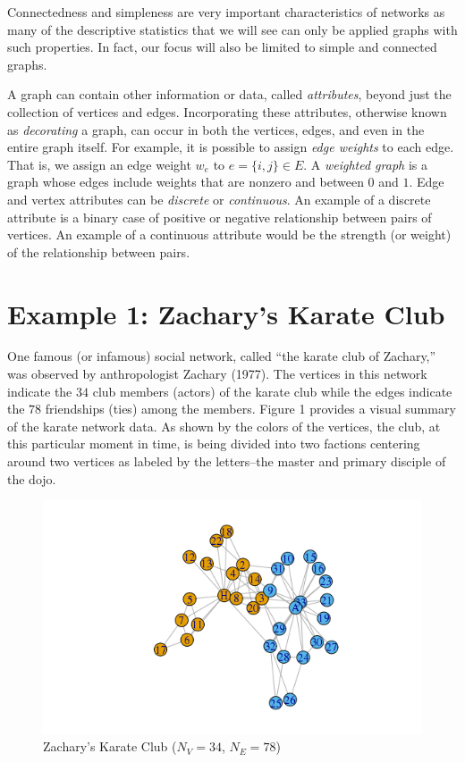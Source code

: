 \documentclass[12pt,twoside]{amherstthesis}
\begin{document}
  Connectedness and simpleness are very important characteristics of
  networks as many of the descriptive statistics that we will see can only
  be applied graphs with such properties. In fact, our focus will also be
  limited to simple and connected graphs.
  
  A graph can contain other information or data, called \emph{attributes},
  beyond just the collection of vertices and edges. Incorporating these
  attributes, otherwise known as \emph{decorating} a graph, can occur in
  both the vertices, edges, and even in the entire graph itself. For
  example, it is possible to assign \emph{edge weights} to each edge. That
  is, we assign an edge weight \(w_e\) to \(e = \{i, j\} \in E\). A
  \emph{weighted graph} is a graph whose edges include weights that are
  nonzero and between \(0\) and \(1\). Edge and vertex attributes can be
  \emph{discrete} or \emph{continuous}. An example of a discrete attribute
  is a binary case of positive or negative relationship between pairs of
  vertices. An example of a continuous attribute would be the strength (or
  weight) of the relationship between pairs.
  
  \section{Example 1: Zachary's Karate
  Club}\label{example-1-zacharys-karate-club}
  
  One famous (or infamous) social network, called ``the karate club of
  Zachary,'' was observed by anthropologist Zachary (1977). The vertices
  in this network indicate the \(34\) club members (actors) of the karate
  club while the edges indicate the \(78\) friendships (ties) among the
  members. Figure 1 provides a visual summary of the karate network data.
  As shown by the colors of the vertices, the club, at this particular
  moment in time, is being divided into two factions centering around two
  vertices as labeled by the letters--the master and primary disciple of
  the dojo.
  
  \begin{figure}[htbp]
  \centering
  \includegraphics{figure/01karateplot.png}
  \caption{Zachary's Karate Club (\(N_V = 34\), \(N_E = 78\))}
  \end{figure}
  
\end{document}
